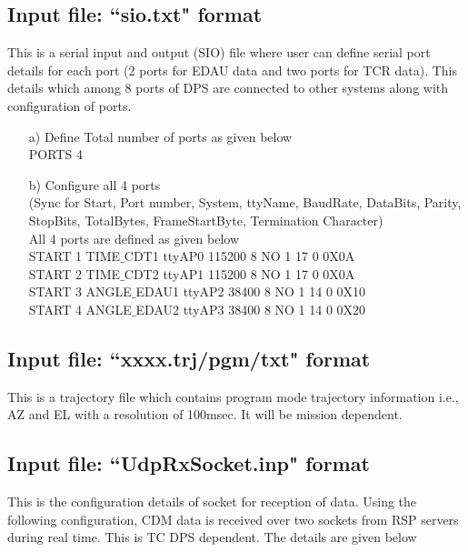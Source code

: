 \subsection{Input file: ``sio.txt" format}
\label{section:sio}
This is a serial input and output (SIO) file where user can define serial port details for each port (2 ports for EDAU data and two ports for TCR data). This details which among 8 ports of DPS are connected to other systems along with configuration of ports. 
\begin{enumerate}
	\item [a)] Define Total number of ports as given below\\
	PORTS 4
	\item [b)] Configure all 4 ports\\ (Sync for Start, Port number, System, ttyName, BaudRate, DataBits, Parity, StopBits, TotalBytes, FrameStartByte, Termination Character)\\
	All 4 ports are defined as given below\\
	START	1	TIME$\_$CDT1	ttyAP0	115200	8	NO	1	17	0	0X0A\\
	START	2	TIME$\_$CDT2	ttyAP1	115200	8	NO	1	17	0	0X0A\\
	START	3	ANGLE$\_$EDAU1	ttyAP2	38400	8	NO	1	14	0	0X10\\
	START	4	ANGLE$\_$EDAU2	ttyAP3	38400	8	NO	1	14	0	0X20\\
\end{enumerate}


\subsection{Input file: ``xxxx.trj/pgm/txt" format}
\label{section:pgm}
This is a trajectory file which contains program mode trajectory information i.e., AZ and EL with a resolution of 100msec. It will be mission dependent. 
\subsection{Input file: ``UdpRxSocket.inp" format}
\label{Label:RXSoc}
This is the configuration details of socket for reception of data. Using the following configuration, CDM data is received over two sockets from RSP servers during real time. This is TC DPS dependent. The details are given below

